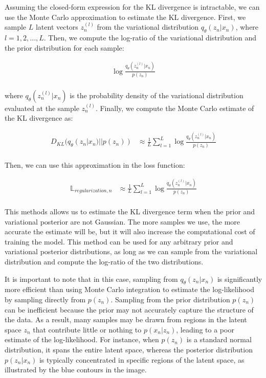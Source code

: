 \documentclass{article}
\begin{document}
Assuming the closed-form expression for the KL divergence is intractable, we can use the Monte Carlo approximation to estimate the KL divergence.
First, we sample $L$ latent vectors $z_n^{(l)}$ from the variational distribution $q_{\theta}(z_n|x_n)$, where $l = 1, 2, ..., L$.
Then, we compute the log-ratio of the variational distribution and the prior distribution for each sample:

\begin{align*}
    \log \frac{q_{\theta}(z_n^{(l)}|x_n)}{p(z_n)} \\
\end{align*}

where $q_{\theta}(z_n^{(l)}|x_n)$ is the probability density of the variational distribution evaluated at the sample $z_n^{(l)}$.
Finally, we compute the Monte Carlo estimate of the KL divergence as:

\begin{align*}
    D_{KL}(q_{\theta}(z_n|x_n) || p(z_n)) &\approx \frac{1}{L} \sum_{l=1}^{L} \log \frac{q_{\theta}(z_n^{(l)}|x_n)}{p(z_n)} \\
\end{align*}

Then, we can use this approximation in the loss function:

\begin{align*}
    \mathbb{L}_{regularization,n} &\approx \frac{1}{L} \sum_{l=1}^{L} \log \frac{q_{\theta}(z_n^{(l)}|x_n)}{p(z_n)} \\
\end{align*}

This methods allows us to estimate the KL divergence term when the prior and variational posterior are not Gaussian. The more
samples we use, the more accurate the estimate will be, but it will also increase the computational cost of training the model.
This method can be used for any arbitrary prior and variational posterior distributions, as long as we can sample from the variational distribution
and compute the log-ratio of the two distributions.

It is important to note that in this case, sampling from \( q_{\theta}(z_n|x_n) \) is significantly more efficient than using Monte Carlo integration to estimate the log-likelihood by sampling directly from \( p(z_n) \). Sampling from the prior distribution \( p(z_n) \) can be inefficient because the prior may not accurately capture the structure of the data. As a result, many samples may be drawn from regions in the latent space \( z_n \) that contribute little or nothing to \( p(x_n | z_n) \), leading to a poor estimate of the log-likelihood. For instance, when \( p(z_n) \) is a standard normal distribution, it spans the entire latent space, whereas the posterior distribution \( p(z_n | x_n) \) is typically concentrated in specific regions of the latent space, as illustrated by the blue contours in the image.
\end{document}
